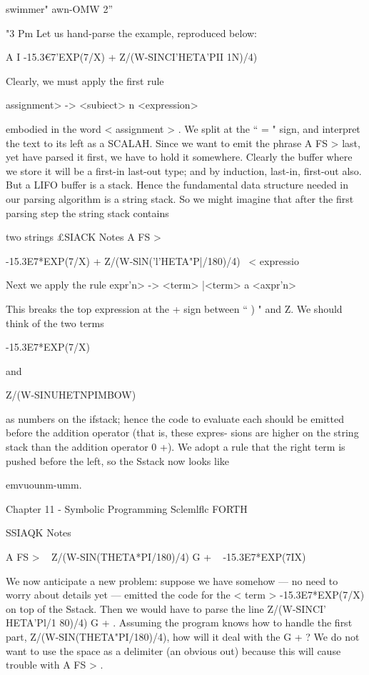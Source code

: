 swimmer" awn-OMW 2”

"3 Pm
Let us hand-parse the example, reproduced below:

A I -15.3€7'EXP(7/X) + Z/(W-SINCI'HETA'PII 1N)/4)

Clearly, we must apply the ﬁrst rule

\<assignment> -> <subiect> n <expression>

embodied in the word < assignment > . We split at the “ = " sign,
and interpret the text to its left as a SCALAH. Since we want to
emit the phrase A FS > last, yet have parsed it ﬁrst, we have to
hold it somewhere. Clearly the buffer where we store it will be a
first-in last-out type; and by induction, last-in, first-out also. But
a LIFO buffer is a stack. Hence the fundamental data structure
needed in our parsing algorithm is a string stack. So we might
imagine that after the ﬁrst parsing step the string stack contains

 

two strings
£SIACK Notes
A FS > \ < subject >

-15.3E7*EXP(7/X) + Z/(W-SlN('l’HETA"P|/180)/4) \ < expressio

Next we apply the rule
\<expr'n> -> <term> |<term> a <axpr'n>

This breaks the top expression at the + sign between “ ) " and Z.
We should think of the two terms

-15.3E7*EXP(7/X)

and

Z/(W-SINUHETNPIMBOW)

as numbers on the ifstack; hence the code to evaluate each should
be emitted before the addition operator (that is, these expres-
sions are higher on the string stack than the addition operator
0 +). We adopt a rule that the right term is pushed before the
left, so the Sstack now looks like

emvuounm-umm.

Chapter 11 - Symbolic Programming Sclemlﬂc FORTH

 

SSIAQK Notes

A FS > \ < subject >
Z/(W-SIN(THETA*PI/180)/4) G + \ <term >
-15.3E7*EXP(7IX) \ < term >

We now anticipate a new problem: suppose we have somehow —
no need to worry about details yet — emitted the code for the
< term > -15.3E7*EXP(7/X) on top of the Sstack. Then we
would have to parse the line Z/(W-SINCI’ HETA'Pl/1 80)/4) G + .
Assuming the program knows how to handle the ﬁrst part,
Z/(W-SIN(THETA"PI/180)/4), how will it deal with the G + ?
We do not want to use the space as a delimiter (an obvious out)
because this will cause trouble with A FS > .

